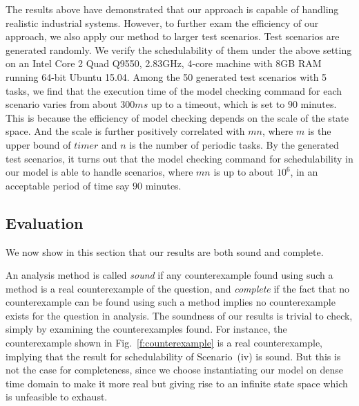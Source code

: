 \documentclass[journal]{IEEEtranTIE}
\begin{document}
The results above have demonstrated that our approach is capable of
handling realistic industrial systems. However, to further exam the
efficiency of our approach, we also apply our method to larger test
scenarios. Test scenarios are generated randomly. We verify the
schedulability of them under the above setting on an Intel Core 2 Quad
Q9550, 2.83GHz, 4-core machine with 8GB RAM running 64-bit Ubuntu
15.04. Among the 50 generated test scenarios with 5 tasks, we find
that the execution time of the model checking command for each
scenario varies from about $300ms$ up to a timeout, which is set to
$90$ minutes. This is because the efficiency of model checking depends
on the scale of the state space. And the scale is further positively
correlated with $mn$, where $m$ is the upper bound of $\mathit{timer}$
and $n$ is the number of periodic tasks. By the generated test
scenarios, it turns out that the model checking command for
schedulability in our model is able to handle scenarios, where $mn$ is
up to about $10^6$, in an acceptable period of time say $90$ minutes.


\subsection{Evaluation}
We now show in this section that our results are both sound and
complete.

An analysis method is called \emph{sound} if any counterexample found
using such a method is a real counterexample of the question, and
\emph{complete} if the fact that no counterexample can be found using
such a method implies no counterexample exists for the question in
analysis. The soundness of our results is trivial to check, simply by
examining the counterexamples found. For instance, the counterexample
shown in Fig.~\ref{f:counterexample} is a real counterexample,
implying that the result for schedulability of Scenario~(iv) is
sound. But this is not the case for completeness, since we choose
instantiating our model on dense time domain to make it more real but
giving rise to an infinite state space which is unfeasible to exhaust.
\end{document}
